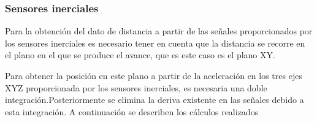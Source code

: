 \subsubsection{Sensores inerciales}

	
	Para la obtención del dato de distancia a partir de las señales proporcionados por los sensores inerciales es necesario tener en cuenta que la distancia se recorre en el plano en el que se produce el avance, que es este caso es el plano XY.

Para obtener la posición en este plano a partir de la aceleración en los tres ejes XYZ proporcionada por los sensores inerciales, es necesaria una doble integración.Posteriormente se elimina la deriva existente en las señales debido a esta integración. A continuación se describen los cálculos realizados

